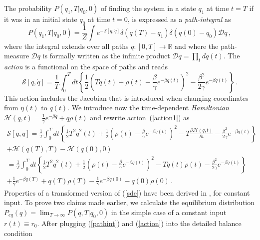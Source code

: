 \documentclass[11pt]{article}
\theoremstyle{definition}
\begin{document}
The probability $P(q_1,T|q_0,0)$ of finding the system in a state $q_1$ at time $t = T$ if it was in an initial state $q_0$ at time $t = 0$, is expressed as a {\em path-integral} as
\begin{equation}\label{pathint}
P(q_1,T|q_0,0)
=
\frac{1}{Z}
\int
e^{-{\mathcal S}[q,\dot q]}
\delta(q(T)-q_1)
\delta(q(0)-q_0)
\mathcal{D}q \,,
\end{equation}
where the integral extends over all paths $q:[0,T]\rightarrow \mathbb R$ and where the path-measure $\mathcal Dq$ is formally written as the infinite product
${\mathcal Dq}=\prod_{t}dq(t)$.
The {\em action} is a functional on the space of paths and reads  \cite{lau_2007}
\begin{equation}\label{action1}
{\mathcal S}[{q},\dot q]
=
\frac{1}{T}
\int_0^T dt \left\{
\frac{1}{2}
\left(
    T\dot q(t)
    +
    \rho(t)
    -
    \frac{\beta}{\gamma}e^{-\beta q(t)}\right)^2
    -
    \frac{\beta^2}{2\gamma}e^{-\beta q(t)}
\right\} \,.
\end{equation}
This action includes the Jacobian that is introduced when changing coordinates from
 ${\eta(t)}$ to $q(t)$.
We introduce now the time-dependent {\em Hamiltonian}
$  \mathcal{H}(q,t)= \frac{1}{\gamma}e^{-\beta q}+q\rho(t)$
and rewrite action~(\ref{action1}) as
\begin{multline}\label{action}
{\mathcal S}[{q},\dot q]
= \frac{1}{T}
\int_0^T dt\left\{
    \frac{1}{2}
    T^2\dot q^2(t) +
    \frac{1}{2}
    \left(\rho(t)-\frac{\beta}{\gamma}e^{-\beta q(t)}\right)^2 -
    T\frac{\partial \mathcal{H}(q,t)}{\partial t} -
    \frac{\beta^2}{2\gamma}e^{-\beta q(t)}
\right\}
\\
+ \mathcal{H}(q(T),T) - \mathcal{H}(q(0),0)
\\
= \frac{1}{T}
\int_0^T dt\left\{
    \frac{1}{2}
    T^2\dot q^2(t) +
    \frac{1}{2}
    \left(\rho(t)-\frac{\beta}{\gamma}e^{-\beta q(t)}\right)^2 -
    Tq(t)\dot\rho(t) -
     \frac{\beta^2}{2\gamma}e^{-\beta q(t)}
\right\}
\\
+
    \frac{1}{\gamma}e^{-\beta q(T)}+q(T)\rho(T)
   -\frac{1}{\gamma}e^{-\beta q(0)}-q(0)\rho(0)
\,.
\end{multline}
Properties of a transformed version of (\ref{sde}) have been derived in \cite{dutre_1977_SDE, schenzle_1979_multStochProc, fujisaka_1986_intermittency}, for constant input.
To prove two claims made earlier, we calculate the equilibrium distribution $P_{eq}(q) = \lim_{T\rightarrow\infty} P(q,T|q_0,0)$ in the simple case of a constant input $r(t)\equiv r_{0}$. After plugging (\ref{pathint}) and (\ref{action}) into the detailed balance condition
\end{document}
